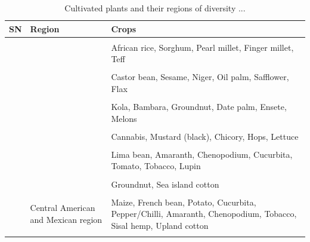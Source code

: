 \documentclass[11pt,ignorenonframetext,aspectratio=169]{beamer}
\begin{document}
\begin{frame}{}
\protect\hypertarget{section-11}{}
\begin{table}

\caption{\label{tab:cultivated-megacentres-tab3}Cultivated plants and their regions of diversity ...}
\centering
\fontsize{8}{10}\selectfont
\begin{tabular}[t]{>{\raggedright\arraybackslash}p{2em}>{\raggedright\arraybackslash}p{14em}>{\raggedright\arraybackslash}p{35em}}
\toprule
SN & Region & Crops\\
\midrule
\cellcolor{gray!6}{8} & \cellcolor{gray!6}{African region} & \cellcolor{gray!6}{Wheat (Durum, Emmer, Poulard, Bread)}\\
 &  & African rice, Sorghum, Pearl millet, Finger millet, Teff\\
\cellcolor{gray!6}{} & \cellcolor{gray!6}{} & \cellcolor{gray!6}{Cowpea, Bottle gourd, Okra, Yams, Cucumber}\\
 &  & Castor bean, Sesame, Niger, Oil palm, Safflower, Flax\\
\cellcolor{gray!6}{} & \cellcolor{gray!6}{} & \cellcolor{gray!6}{Cotton, Kenaf, Coffee}\\
\addlinespace
 &  & Kola, Bambara, Groundnut, Date palm, Ensete, Melons\\
\cellcolor{gray!6}{9} & \cellcolor{gray!6}{European-siberian region} & \cellcolor{gray!6}{Peach, Pear, Plum, Apricot, Apple, Almond, Walnut, Pistachio, Cherry}\\
 &  & Cannabis, Mustard (black), Chicory, Hops, Lettuce\\
\cellcolor{gray!6}{10} & \cellcolor{gray!6}{South American region} & \cellcolor{gray!6}{Potato, Sweet potato, Xanthosoma}\\
 &  & Lima bean, Amaranth, Chenopodium, Cucurbita, Tomato, Tobacco, Lupin\\
\addlinespace
\cellcolor{gray!6}{} & \cellcolor{gray!6}{} & \cellcolor{gray!6}{Papaya, Pineapple}\\
 &  & Groundnut, Sea island cotton\\
\cellcolor{gray!6}{} & \cellcolor{gray!6}{} & \cellcolor{gray!6}{Cassava, Cacao, Rubber tree, Passion fruit}\\
11 & Central American and Mexican region & Maize, French bean, Potato, Cucurbita, Pepper/Chilli, Amaranth, Chenopodium, Tobacco, Sisal hemp, Upland cotton\\
\cellcolor{gray!6}{12} & \cellcolor{gray!6}{North American region} & \cellcolor{gray!6}{Jeruselum artichoke, Sunflower, Plum, Raspberry, Strawberry}\\
\bottomrule
\end{tabular}
\end{table}
\end{frame}
\end{document}
